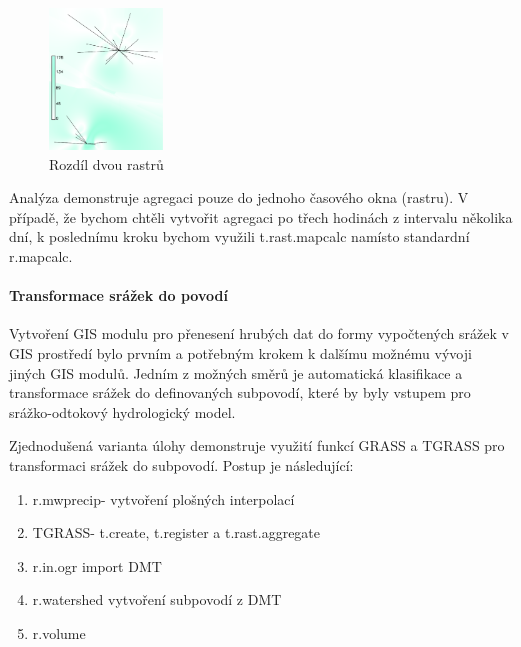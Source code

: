 \documentclass[a4paper,12pt,oneside]{report}
\begin{document}
\begin{figure}[h!]
    \centering
    \includegraphics[width=0.27\textwidth]{./img/intanalys/rozdil.png}
    \caption[GUI modul]{Rozdíl dvou rastrů  \centering  }
        \label{fig:baseline}
 \end{figure}
 
Analýza demonstruje agregaci pouze do jednoho časového okna (rastru). V případě, že bychom chtěli vytvořit  agregaci po třech hodinách z intervalu několika dní, k poslednímu kroku bychom využili t.rast.mapcalc namísto standardní r.mapcalc.

\paragraph*{Transformace srážek do povodí}
Vytvoření GIS modulu pro přenesení hrubých dat do formy vypočtených srážek v GIS prostředí bylo prvním a potřebným krokem k dalšímu možnému vývoji jiných GIS modulů. Jedním z možných směrů je automatická klasifikace a transformace srážek do definovaných subpovodí, které by byly vstupem pro srážko-odtokový hydrologický model.

Zjednodušená varianta úlohy demonstruje využití funkcí GRASS a TGRASS pro transformaci srážek do subpovodí. Postup je následující:

\begin{enumerate}
\item r.mwprecip- vytvoření plošných interpolací
\item TGRASS- t.create, t.register a t.rast.aggregate
\item r.in.ogr import \acs{DMT}
\item r.watershed vytvoření subpovodí z DMT
\item r.volume
\end{enumerate}
\end{document}
